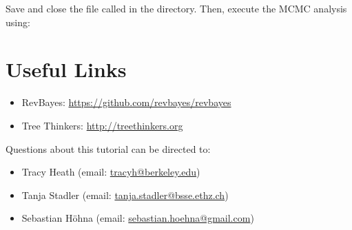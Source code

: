 {\begin{framed}
Save and close the file called {\textcolor{red}{}} in the  directory. 
Then, execute the MCMC analysis using: \colorbox{shadecolor}{}
\end{framed}}


\bigskip
\section*{Useful Links}

\begin{itemize}
\item RevBayes: \href{https://github.com/revbayes/revbayes}{https://github.com/revbayes/revbayes} \\ \vspace{-7mm}
\item Tree Thinkers: \href{http://treethinkers.org/}{http://treethinkers.org} \\ \vspace{-7mm}
\end{itemize}

Questions about this tutorial can be directed to: \\\vspace{-10mm}
\begin{itemize}
\item Tracy Heath (email: \href{mailto:tracyh@berkeley.edu}{tracyh@berkeley.edu}) \\\vspace{-8mm}
\item Tanja Stadler (email: \href{mailto:tanja.stadler@bsse.ethz.ch}{tanja.stadler@bsse.ethz.ch}) \\\vspace{-8mm} 
\item Sebastian H\"{o}hna (email: \href{mailto:sebastian.hoehna@gmail.com}{sebastian.hoehna@gmail.com})
\end{itemize}




